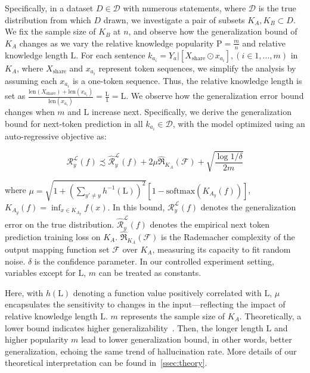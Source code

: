 Specifically, in a dataset $D\in\mathcal{D}$ with numerous statements, where $\mathcal{D}$ is the true distribution from which $D$ drawn, we investigate a pair of subsets $K_A, K_B \subset D$. We fix the sample size of $K_B$ at $n$, and observe how the generalization bound of $K_A$ changes as we vary the relative knowledge popularity $\text{P} = \frac{m}{n}$ and relative knowledge length $\text{L}$.
For each sentence $k_{a_i} = Y_a | [X_{\mathrm{share}} \odot x_{a_i}], (i \in {1, ..., m})$ in $K_A$, where $X_{\mathrm{share}}$ and $x_{a_i}$ represent token sequences, we simplify the analysis by assuming each $x_{a_i}$ is a one-token sequence. Thus, the relative knowledge length is set as $\frac{\text{len}(X_{\mathrm{share}}) + \text{len}(x_{a_i})}{\text{len}(x_{a_i})} = \frac{\text{L}}{1} = \text{L}$.
We observe how the generalization error bound changes when $m$ and $\text{L}$ increase next.
Specifically, we derive the generalization bound for next-token prediction in all $k_{a_i} \in \mathcal{D}$, with the model optimized using an auto-regressive objective as:

\vspace{-1em}
{\small
\begin{equation}
\label{eq.final_bound}
\mathcal{R}^{\mathcal{L}}_y(f) \! \precsim \! \widehat{\mathcal{R}}^{\mathcal{L}}_y(f) \!+\! 2\mu\widehat{\Re}_{K_A}(\mathcal{F}) + \sqrt{\frac{\log 1/\delta}{2m}} 
\end{equation}
}
\vspace{-1em}

\noindent where {\scriptsize $\mu=\sqrt{1 + \left( \sum_{y' \neq y} h^{-1}(\text{L}) \right)^2} \left[ 1 - \mathrm{softmax}\left( K_{A_y}(f) \right) \right]$}, {\scriptsize$K_{A_y}(f) = \inf_{x \in K_{A_y}} f(x)$}.
In this bound,  ${\mathcal{R}}^{\mathcal{L}}_y(f)$ denotes the generalization error on the true distribution.
$\widehat{\mathcal{R}}^{\mathcal{L}}_y(f)$ denotes the empirical next token prediction training loss on $K_A$.
$\widehat{{\Re}}_{K_A}(\mathcal{F})$ is the Rademacher complexity of the output mapping function set $\mathcal{F}$ over $K_A$, measuring its capacity to fit random noise. 
$\delta$ is the confidence parameter.
In our controlled experiment setting, variables except for $\text{L}$, $m$ can be treated as constants.

Here, with $h(\text{L})$ denoting a function value positively correlated with $\text{L}$, $\mu$ encapsulates the sensitivity to changes in the input—reflecting the impact of relative knowledge length $\text{L}$. $m$ represents the sample size of $K_A$.
Theoretically, a lower bound indicates higher generalizability~\cite{cao2019learning}.
Then, the longer length $\text{L}$ and higher popularity $m$ lead to lower generalization bound, in other words, better generalization, echoing the same trend of hallucination rate.
More details of our theoretical interpretation can be found in~\ref{ssec:theory}.
